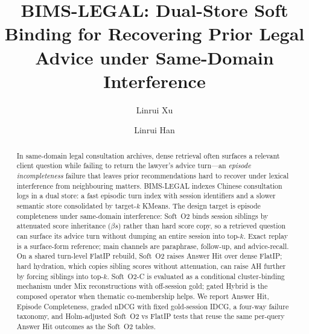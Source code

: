 \documentclass[preprint,12pt,authoryear]{elsarticle}
\begin{document}
\begin{frontmatter}

\title{BIMS-LEGAL: Dual-Store Soft Binding for Recovering Prior Legal Advice under Same-Domain Interference}

\author[uw]{Linrui Xu}
\author[lab,idl]{Linrui Han}

\begin{abstract}
\sloppy
In same-domain legal consultation archives, dense retrieval often surfaces a relevant client question while failing to return the lawyer's advice turn---an \emph{episode incompleteness} failure that leaves prior recommendations hard to recover under lexical interference from neighbouring matters.
BIMS-LEGAL indexes Chinese consultation logs in a dual store: a fast episodic turn index with session identifiers and a slower semantic store consolidated by target-$k$ KMeans.
The design target is episode completeness under same-domain interference: Soft~O2 binds session siblings by attenuated score inheritance ($\beta s$) rather than hard score copy, so a retrieved question can surface its advice turn without dumping an entire session into top-$k$.
Exact replay is a surface-form reference; main channels are paraphrase, follow-up, and advice-recall.
On a shared turn-level FlatIP rebuild, Soft~O2 raises Answer Hit over dense FlatIP; hard hydration, which copies sibling scores without attenuation, can raise AH further by forcing siblings into top-$k$.
Soft~O2-C is evaluated as a conditional cluster-binding mechanism under Mix reconstructions with off-session gold; gated Hybrid is the composed operator when thematic co-membership helps.
We report Answer Hit, Episode Completeness, graded nDCG with fixed gold-session IDCG, a four-way failure taxonomy, and Holm-adjusted Soft~O2 vs FlatIP tests that reuse the same per-query Answer Hit outcomes as the Soft~O2 tables.
\end{abstract}


\end{frontmatter}
\end{document}
